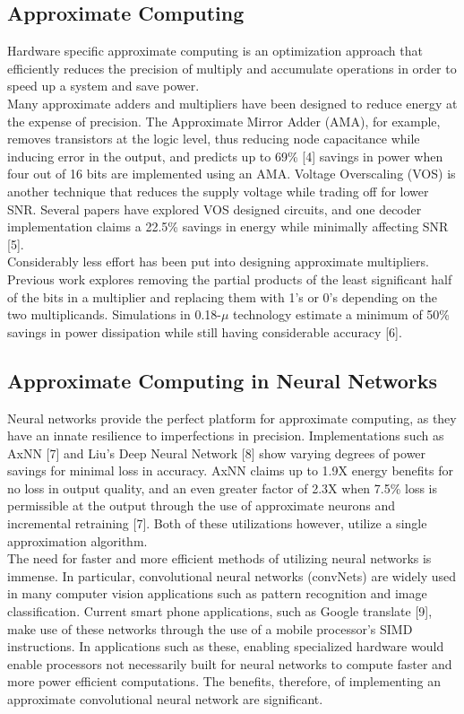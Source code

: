 \documentclass[conference]{IEEEtran}
\begin{document}
\subsection{Approximate Computing}
	Hardware specific approximate computing is an optimization approach that efficiently reduces the precision of multiply and accumulate operations in order to speed up a system and save power. \\
	\indent Many approximate adders and multipliers have been designed to reduce energy at the expense of precision. The Approximate Mirror Adder (AMA), for example, removes transistors at the logic level, thus reducing node capacitance while inducing error in the output, and predicts up to 69\% [4] savings in power when four out of 16 bits are implemented using an AMA. Voltage Overscaling (VOS) is another technique that reduces the supply voltage while trading off for lower SNR. Several papers have explored VOS designed circuits, and one decoder implementation claims a 22.5\% savings in energy while minimally affecting SNR [5]. \\
	\indent Considerably less effort has been put into designing approximate multipliers. Previous work explores removing the partial products of the least significant half of the bits in a multiplier and replacing them with 1's or 0's depending on the two multiplicands. Simulations in 0.18-$\mu$ technology estimate a minimum of 50\% savings in power dissipation while still having considerable accuracy [6].

\subsection{Approximate Computing in Neural Networks}
	Neural networks provide the perfect platform for approximate computing, as they have an innate resilience to imperfections in precision. Implementations such as AxNN [7] and Liu's Deep Neural Network [8] show varying degrees of power savings for minimal loss in accuracy. AxNN claims up to 1.9X energy benefits for no loss in output quality, and an even greater factor of 2.3X when 7.5\% loss is permissible at the output through the use of approximate neurons and incremental retraining [7]. Both of these utilizations however, utilize a single approximation algorithm. \\	
	\indent The need for faster and more efficient methods of utilizing neural networks is immense. In particular, convolutional neural networks (convNets) are widely used in many computer vision applications such as pattern recognition and image classification. Current smart phone applications, such as Google translate [9], make use of these networks through the use of a mobile processor's SIMD instructions. In applications such as these, enabling specialized hardware would enable processors not necessarily built for neural networks to compute faster and more power efficient computations. The benefits, therefore, of implementing an approximate convolutional neural network are significant. \\
	
\end{document}
